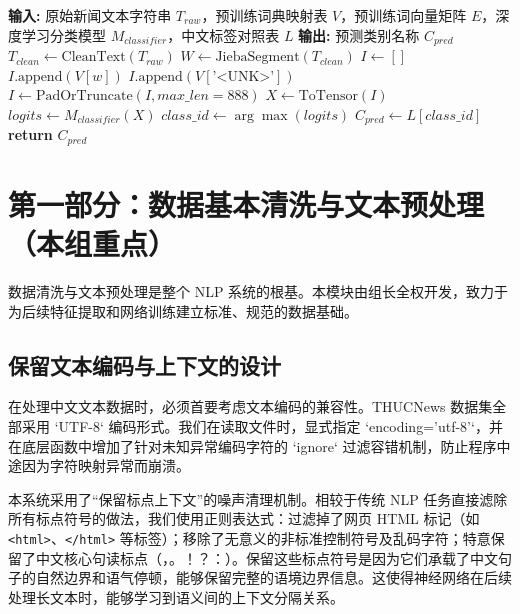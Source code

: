 \documentclass[UTF8,a4paper,11pt]{ctexart}
\begin{document}
\begin{algorithm}[H]
\caption{统一分类预测流水线 (End-to-End Prediction Pipeline)}
\label{alg:pipeline}
\begin{algorithmic}[1]
\State \textbf{输入:} 原始新闻文本字符串 $T_{raw}$，预训练词典映射表 $V$，预训练词向量矩阵 $E$，深度学习分类模型 $M_{classifier}$，中文标签对照表 $L$
\State \textbf{输出:} 预测类别名称 $C_{pred}$
\State $T_{clean} \gets \text{CleanText}(T_{raw})$ 
\State $W \gets \text{JiebaSegment}(T_{clean})$ 
\State $I \gets []$
        \State $I.\text{append}(V[w])$
    \Else
        \State $I.\text{append}(V[\text{'<UNK>'}])$
    \EndIf
\EndFor
\State $I \gets \text{PadOrTruncate}(I, max\_len = 888)$ 
\State $X \gets \text{ToTensor}(I)$ 
\State $logits \gets M_{classifier}(X)$ 
\State $class\_id \gets \arg\max(logits)$ 
\State $C_{pred} \gets L[class\_id]$ 
\State \textbf{return} $C_{pred}$
\end{algorithmic}
\end{algorithm}

\section{第一部分：数据基本清洗与文本预处理（本组重点）}
数据清洗与文本预处理是整个 NLP 系统的根基。本模块由组长全权开发，致力于为后续特征提取和网络训练建立标准、规范的数据基础。

\subsection{保留文本编码与上下文的设计}
在处理中文文本数据时，必须首要考虑文本编码的兼容性。THUCNews 数据集全部采用 `UTF-8` 编码形式。我们在读取文件时，显式指定 `encoding='utf-8'`，并在底层函数中增加了针对未知异常编码字符的 `ignore` 过滤容错机制，防止程序中途因为字符映射异常而崩溃。

本系统采用了“保留标点上下文”的噪声清理机制。相较于传统 NLP 任务直接滤除所有标点符号的做法，我们使用正则表达式：过滤掉了网页 HTML 标记（如 \texttt{<html>}、\texttt{</html>} 等标签）；移除了无意义的非标准控制符号及乱码字符；特意保留了中文核心句读标点（，。！？：）。保留这些标点符号是因为它们承载了中文句子的自然边界和语气停顿，能够保留完整的语境边界信息。这使得神经网络在后续处理长文本时，能够学习到语义间的上下文分隔关系。
\end{document}
